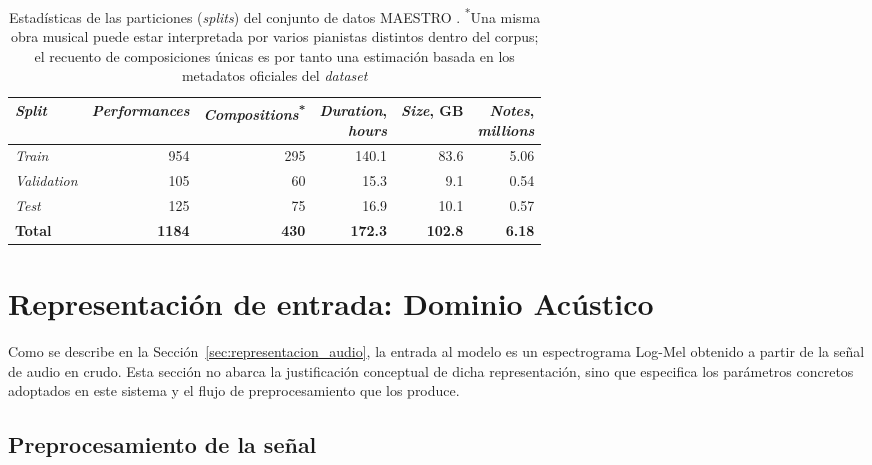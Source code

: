 \begin{table}[htbp]
    \centering
    \renewcommand{\arraystretch}{1.2}
    \begin{tabular}{l|r|r|r|r|r}
        \textit{Split} &
        \textit{Performances} &
        \textit{Compositions}\textsuperscript{*} &
        \makecell{\textit{Duration},\\\textit{hours}} &
        \textit{Size}, GB &
        \makecell{\textit{Notes},\\\textit{millions}} \\
        \hline
        \textit{Train}      & 954  & 295 & 140.1 & 83.6  & 5.06 \\
        \textit{Validation} & 105  &  60 &  15.3 &  9.1  & 0.54 \\
        \textit{Test}       & 125  &  75 &  16.9 & 10.1  & 0.57 \\
        \textbf{Total} & \textbf{1184} & \textbf{430} &
        \textbf{172.3} & \textbf{102.8} & \textbf{6.18} \\
    \end{tabular}
    \caption{Estadísticas de las particiones (\textit{splits}) del
    conjunto de datos MAESTRO \cite{hawthorne2018enabling}.
    \textsuperscript{*}Una misma obra musical puede estar interpretada
por varios pianistas distintos dentro del corpus; el recuento de
composiciones únicas es por tanto una estimación basada en los
metadatos oficiales del \textit{dataset}}
    \label{tab:maestro_splits}
\end{table}

\section{Representación de entrada: Dominio Acústico}
\label{sec:dominio_acustico}

Como se describe en la Sección~\ref{sec:representacion_audio}, la
entrada al modelo es un espectrograma Log-Mel obtenido a partir de la
señal de audio en crudo. Esta sección no abarca
la justificación conceptual de dicha representación, sino que especifica
los parámetros concretos adoptados en este sistema y el flujo de
preprocesamiento que los produce.

\subsection{Preprocesamiento de la señal}

